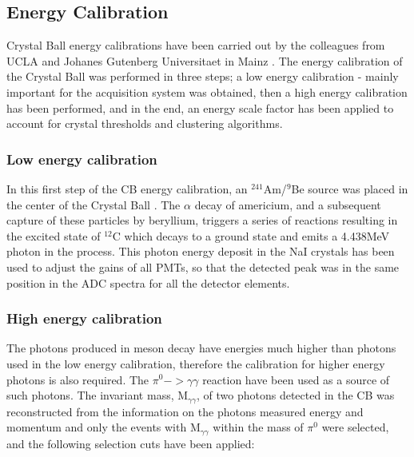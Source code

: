 \subsection{Energy Calibration}

\indent Crystal Ball energy calibrations have been carried out by the colleagues from UCLA and Johanes Gutenberg Universitaet in Mainz \cite{marc}. The energy calibration of the Crystal Ball was performed in three steps; a low energy calibration - mainly important for the acquisition system was obtained, then a high energy calibration has been performed, and in the end, an energy scale factor has been applied to account for crystal thresholds and clustering algorithms.

\subsubsection{Low energy calibration}

\indent In this first step of the CB energy calibration, an $^{241}$Am/$^{9}$Be source was placed in the center of the Crystal Ball \cite{marc}. The $\alpha$ decay of americium, and a subsequent capture of these particles by beryllium, triggers a series of reactions resulting in the excited state of $^{12}$C which decays to a ground state and emits a 4.438MeV photon in the process. This photon energy deposit in the NaI crystals has been used to adjust the gains of all PMTs, so that the detected peak was in the same position in the ADC spectra for all the detector elements.

\subsubsection{High energy calibration}

\indent The photons produced in meson decay have energies much higher than photons used in the low energy calibration, therefore the calibration for higher energy photons is also required. The $\pi^{0}->\gamma\gamma$ reaction have been used as a source of such photons. The invariant mass, M$_{\gamma\gamma}$, of two photons detected in the CB was reconstructed from the information on the photons measured energy and momentum and only the events with M$_{\gamma\gamma}$ within the mass of $\pi^{0}$ were selected, and the following selection cuts have been applied:

